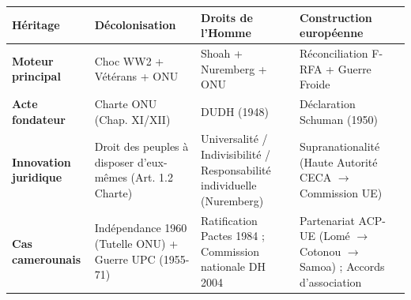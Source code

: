 \documentclass[11pt]{article}
\begin{document}
\begin{aretenir}
\begin{center}
\begin{tabularx}{\linewidth}{|l|X|X|X|}\hline
\textbf{Héritage} & \textbf{Décolonisation} & \textbf{Droits de l'Homme} & \textbf{Construction européenne} \\ \hline
\textbf{Moteur principal} & Choc WW2 + Vétérans + ONU & Shoah + Nuremberg + ONU & Réconciliation F-RFA + Guerre Froide \\ \hline
\textbf{Acte fondateur} & Charte ONU (Chap. XI/XII) & DUDH (1948) & Déclaration Schuman (1950) \\ \hline
\textbf{Innovation juridique} & Droit des peuples à disposer d'eux-mêmes (Art. 1.2 Charte) & Universalité / Indivisibilité / Responsabilité individuelle (Nuremberg) & Supranationalité (Haute Autorité CECA $\to$ Commission UE) \\ \hline
\textbf{Cas camerounais} & Indépendance 1960 (Tutelle ONU) + Guerre UPC (1955-71) & Ratification Pactes 1984 ; Commission nationale DH 2004 & Partenariat ACP-UE (Lomé $\to$ Cotonou $\to$ Samoa) ; Accords d'association \\ \hline
\end{tabularx}
\end{center}
\end{aretenir}
\end{document}
